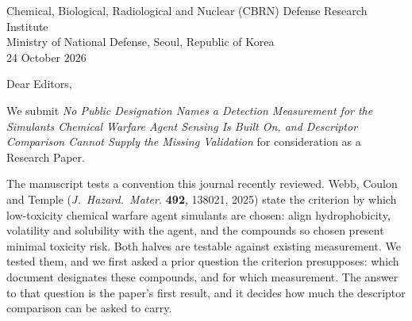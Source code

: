 \documentclass[11pt,a4paper]{article}
\begin{document}
{\small
Chemical, Biological, Radiological and Nuclear (CBRN) Defense Research Institute\\
Ministry of National Defense, Seoul, Republic of Korea\\
24 October 2026}

\vspace{6pt}

Dear Editors,

We submit \textit{No Public Designation Names a Detection Measurement for the
Simulants Chemical Warfare Agent Sensing Is Built On, and Descriptor Comparison
Cannot Supply the Missing Validation} for consideration as
a Research Paper.

The manuscript tests a convention this journal recently reviewed. Webb, Coulon
and Temple (\textit{J.\ Hazard.\ Mater.} \textbf{492}, 138021, 2025) state the
criterion by which low-toxicity chemical warfare agent simulants are chosen:
align hydrophobicity, volatility and solubility with the agent, and the compounds
so chosen present minimal toxicity risk. Both halves are testable against
existing measurement. We tested them, and we first asked a prior question the
criterion presupposes: which document designates these compounds, and for
which measurement. The answer to that question is the paper's first result,
and it decides how much the descriptor comparison can be asked to carry.
\end{document}
